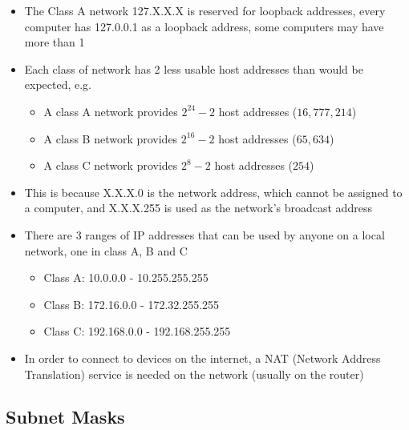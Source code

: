 \begin{itemize}
\begin{itemize}
  \end{itemize}
  \item The Class A network 127.X.X.X is reserved for loopback addresses, every computer has 127.0.0.1 as a loopback address, some computers may have more than 1
  \item Each class of network has 2 less usable host addresses than would be expected, e.g.
  \begin{itemize}
    \item A class A network provides $2^{24} - 2$ host addresses ($16,777,214$)
    \item A class B network provides $2^{16} - 2$ host addresses ($65,634$)
    \item A class C network provides $2^8 - 2$ host addresses ($254$)
  \end{itemize}
  \item This is because X.X.X.0 is the network address, which cannot be assigned to a computer, and X.X.X.255 is used as the network's broadcast address
  \item There are 3 ranges of IP addresses that can be used by anyone on a local network, one in class A, B and C
  \begin{itemize}
    \item Class A: 10.0.0.0 - 10.255.255.255
    \item Class B: 172.16.0.0 - 172.32.255.255
    \item Class C: 192.168.0.0 - 192.168.255.255
  \end{itemize}
  \item In order to connect to devices on the internet, a NAT (Network Address Translation) service is needed on the network (usually on the router)
\end{itemize}

\subsection*{Subnet Masks}

